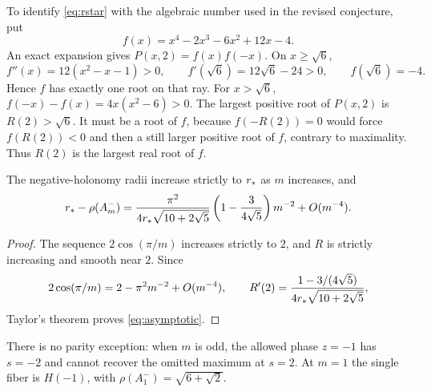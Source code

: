 To identify \eqref{eq:rstar} with the algebraic number used in the revised
conjecture, put
\[
 f(x)=x^4-2x^3-6x^2+12x-4.
\]
An exact expansion gives $P(x,2)=f(x)f(-x)$. On $x\ge\sqrt6$,
\[
 f''(x)=12(x^2-x-1)>0,\qquad
 f'(\sqrt6)=12\sqrt6-24>0,\qquad f(\sqrt6)=-4.
\]
Hence $f$ has exactly one root on that ray. For $x>\sqrt6$,
$f(-x)-f(x)=4x(x^2-6)>0$. The largest positive root of $P(x,2)$ is
$R(2)>\sqrt6$. It must be a root of $f$, because $f(-R(2))=0$ would
force $f(R(2))<0$ and then a still larger positive root of $f$, contrary
to maximality. Thus $R(2)$ is the largest real root of $f$.

\begin{corollary}\label{cor:asymptotic}
The negative-holonomy radii increase strictly to $r_*$ as $m$ increases,
and
\begin{equation}
 r_*-\rho(A_m^-)
 =\frac{\pi^2}{4r_*\sqrt{10+2\sqrt5}}
   \left(1-\frac3{4\sqrt5}\right)m^{-2}+O(m^{-4}).
 \label{eq:asymptotic}
\end{equation}
\end{corollary}
\begin{proof}
The sequence $2\cos(\pi/m)$ increases strictly to $2$, and $R$ is strictly
increasing and smooth near $2$. Since
\[
 2\cos(\pi/m)=2-\pi^2m^{-2}+O(m^{-4}),
 \qquad
 R'(2)=\frac{1-3/(4\sqrt5)}{4r_*\sqrt{10+2\sqrt5}},
\]
Taylor's theorem proves \eqref{eq:asymptotic}.
\end{proof}

There is no parity exception: when $m$ is odd, the allowed phase $z=-1$
has $s=-2$ and cannot recover the omitted maximum at $s=2$.
At $m=1$ the single fiber is $H(-1)$, with
$\rho(A_1^-)=\sqrt{6+\sqrt2}$.
